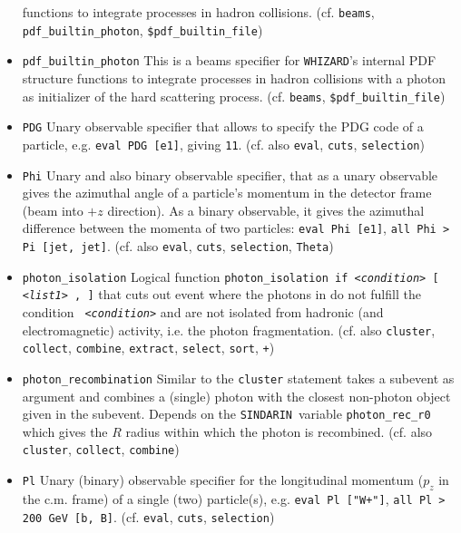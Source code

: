 \documentclass[12pt]{book}
\newcommand{\ttt}[1]{\texttt{#1}}
\newcommand{\whizard}{\ttt{WHIZARD}}
\newcommand{\sindarin}{\ttt{SINDARIN}}
\begin{document}
\begin{itemize}
functions to integrate processes in hadron collisions.
(cf. \ttt{beams}, \ttt{pdf\_builtin\_photon},
\ttt{\$pdf\_builtin\_file})
\item
\ttt{pdf\_builtin\_photon} \newline
This is a beams specifier for \whizard's internal PDF structure
functions to integrate processes in hadron collisions with a photon as
initializer of the hard scattering process.
(cf. \ttt{beams}, \ttt{\$pdf\_builtin\_file})
\item
\ttt{PDG} \newline
Unary observable specifier that allows to specify the PDG code of a
particle, e.g. \ttt{eval PDG [e1]}, giving \ttt{11}. (cf. also
\ttt{eval}, \ttt{cuts}, \ttt{selection})
\item
\ttt{Phi} \newline
Unary and also binary observable specifier, that as a unary observable
gives the azimuthal angle of a particle's momentum in the detector
frame (beam into $+z$ direction). As a binary observable, it gives the
azimuthal difference between the momenta of two particles: \ttt{eval
Phi [e1]},  \ttt{all Phi > Pi [jet, jet]}. (cf. also \ttt{eval},
\ttt{cuts}, \ttt{selection}, \ttt{Theta})
\item
\ttt{photon\_isolation} \newline
Logical function \ttt{photon\_isolation if {\em <condition>} [{\em
<list1>} , {\em <list2>}]} that cuts out event where the photons in
\ttt{{\em <list1>}} do not fulfill the condition \ttt{{\em
<condition>}} and are not isolated from hadronic (and electromagnetic)
activity, i.e. the photon fragmentation. (cf. also \ttt{cluster},
\ttt{collect}, \ttt{combine}, \ttt{extract}, \ttt{select},
\ttt{sort}, \ttt{+})
\item
\ttt{photon\_recombination} \newline
Similar to the \ttt{cluster} statement takes a subevent as argument
and combines a (single) photon with the closest non-photon object
given in the subevent. Depends on the \sindarin\ variable
\ttt{photon\_rec\_r0} which gives the $R$ radius within which the photon
is recombined. (cf. also \ttt{cluster}, \ttt{collect}, \ttt{combine})
\item
\ttt{Pl} \newline
Unary (binary) observable specifier for the longitudinal momentum
($p_z$ in the c.m. frame) of a single (two) particle(s),
e.g. \ttt{eval Pl ["W+"]}, \ttt{all Pl > 200 GeV [b,
B]}. (cf. \ttt{eval}, \ttt{cuts}, \ttt{selection})

\end{itemize}
\end{document}
